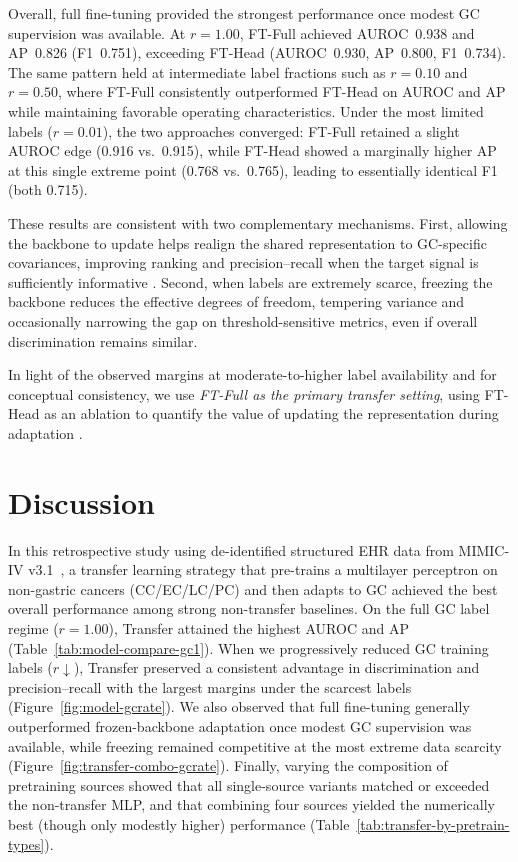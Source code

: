 \documentclass[diagnostics,article,submit,pdftex,moreauthors]{Definitions/mdpi}
\begin{document}
Overall, full fine-tuning provided the strongest performance once modest GC supervision was available. At $r{=}1.00$, FT-Full achieved AUROC~0.938 and AP~0.826 (F1~0.751), exceeding FT-Head (AUROC~0.930, AP~0.800, F1~0.734). The same pattern held at intermediate label fractions such as $r{=}0.10$ and $r{=}0.50$, where FT-Full consistently outperformed FT-Head on AUROC and AP while maintaining favorable operating characteristics. Under the most limited labels ($r{=}0.01$), the two approaches converged: FT-Full retained a slight AUROC edge (0.916 vs.\ 0.915), while FT-Head showed a marginally higher AP at this single extreme point (0.768 vs.\ 0.765), leading to essentially identical F1 (both 0.715).

These results are consistent with two complementary mechanisms. First, allowing the backbone to update helps realign the shared representation to GC-specific covariances, improving ranking and precision–recall when the target signal is sufficiently informative \citep{Pan2010_TLsurvey,Yosinski2014_transferable}. Second, when labels are extremely scarce, freezing the backbone reduces the effective degrees of freedom, tempering variance and occasionally narrowing the gap on threshold-sensitive metrics, even if overall discrimination remains similar.

In light of the observed margins at moderate-to-higher label availability and for conceptual consistency, we use \emph{FT-Full as the primary transfer setting}, using FT-Head as an ablation to quantify the value of updating the representation during adaptation \citep{Caruana1997_MTL,Pan2010_TLsurvey,Yosinski2014_transferable}.



\section{Discussion}
In this retrospective study using de-identified structured EHR data from MIMIC-IV v3.1~\citep{Johnson2024MIMICIV}, a transfer learning strategy that pre-trains a multilayer perceptron on non-gastric cancers (CC/EC/LC/PC) and then adapts to GC achieved the best overall performance among strong non-transfer baselines. On the full GC label regime ($r{=}1.00$), Transfer attained the highest AUROC and AP (Table~\ref{tab:model-compare-gc1}). When we progressively reduced GC training labels ($r\!\downarrow$), Transfer preserved a consistent advantage in discrimination and precision–recall with the largest margins under the scarcest labels (Figure~\ref{fig:model-gcrate}). We also observed that full fine-tuning generally outperformed frozen-backbone adaptation once modest GC supervision was available, while freezing remained competitive at the most extreme data scarcity (Figure~\ref{fig:transfer-combo-gcrate}). Finally, varying the composition of pretraining sources showed that all single-source variants matched or exceeded the non-transfer MLP, and that combining four sources yielded the numerically best (though only modestly higher) performance (Table~\ref{tab:transfer-by-pretrain-types}).
\end{document}
